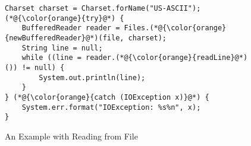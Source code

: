\begin{figure}[t]%
	\centering
\begin{lstlisting}[]
Charset charset = Charset.forName("US-ASCII");
(*@{\color{orange}{try}@*) {
    BufferedReader reader = Files.(*@{\color{orange}{newBufferedReader}@*)(file, charset);
    String line = null;
    while ((line = reader.(*@{\color{orange}{readLine}@*)()) != null) {
        System.out.println(line);
    }
} (*@{\color{orange}{catch (IOException x)}@*) {
    System.err.format("IOException: %s%n", x);
}
\end{lstlisting}
        \vspace{-16pt}
        \caption{An Example with  Reading from File}
        \label{fig:example4}
\end{figure}

